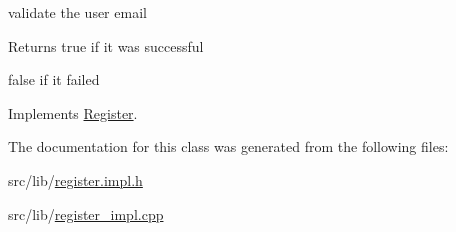 validate the user email 

\begin{DoxyReturn}{Returns}
true if it was successful 

false if it failed 
\end{DoxyReturn}


Implements \hyperlink{classRegister_aeeb9ead57f749601459240fc68cfe7b4}{Register}.



The documentation for this class was generated from the following files\+:\begin{DoxyCompactItemize}
\item 
src/lib/\hyperlink{register_8impl_8h}{register.\+impl.\+h}\item 
src/lib/\hyperlink{register__impl_8cpp}{register\+\_\+impl.\+cpp}\end{DoxyCompactItemize}
